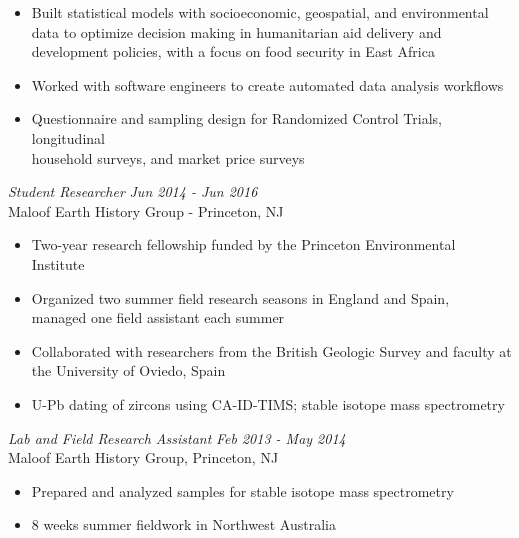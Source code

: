 \documentclass[overlapped, 11pt]{res} %
\begin{document}
\begin{resume}
\begin{itemize} \itemsep -2pt %
\item Built statistical models with socioeconomic, geospatial, and  environmental data to optimize decision making in humanitarian aid delivery and development policies, with a focus on food security in East Africa
\item Worked with software engineers to create automated data analysis workflows 
\item Questionnaire and sampling design for Randomized Control Trials, longitudinal \\ household surveys, and market price surveys

\end{itemize}

%


{\sl Student Researcher} \hfill \emph{Jun 2014 - Jun 2016} \\
Maloof Earth History Group - Princeton, NJ
\begin{itemize} \itemsep -2pt 
\item Two-year research fellowship funded by the Princeton Environmental Institute
\item Organized two summer field research seasons in England and Spain, \\ managed one field assistant each summer
\item Collaborated with researchers from the British Geologic Survey and faculty at the University of Oviedo, Spain
\item U-Pb dating of zircons using CA-ID-TIMS; stable isotope mass spectrometry
\end{itemize} 

{\sl Lab and Field Research Assistant} \hfill \emph{Feb 2013 - May 2014}\\
Maloof Earth History Group, Princeton, NJ 
\begin{itemize} \itemsep -2pt
\item Prepared and analyzed samples for stable isotope mass spectrometry
\item 8 weeks summer fieldwork in Northwest Australia
\end{itemize} 


\end{resume}
\end{document}
